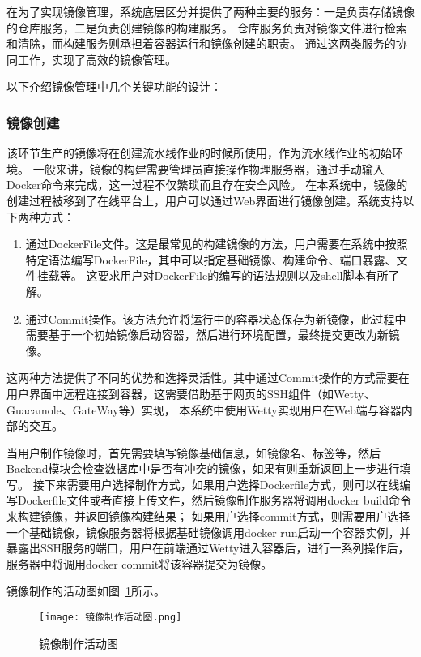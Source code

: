 在为了实现镜像管理，系统底层区分并提供了两种主要的服务：一是负责存储镜像的仓库服务，二是负责创建镜像的构建服务。
仓库服务负责对镜像文件进行检索和清除，而构建服务则承担着容器运行和镜像创建的职责。
通过这两类服务的协同工作，实现了高效的镜像管理。

以下介绍镜像管理中几个关键功能的设计：

\subsubsection{镜像创建}

该环节生产的镜像将在创建流水线作业的时候所使用，作为流水线作业的初始环境。
一般来讲，镜像的构建需要管理员直接操作物理服务器，通过手动输入Docker命令来完成，这一过程不仅繁琐而且存在安全风险。
在本系统中，镜像的创建过程被移到了在线平台上，用户可以通过Web界面进行镜像创建。系统支持以下两种方式：
\begin{enumerate}
  \item 通过DockerFile文件。这是最常见的构建镜像的方法，用户需要在系统中按照特定语法编写DockerFile，其中可以指定基础镜像、构建命令、端口暴露、文件挂载等。
  这要求用户对DockerFile的编写的语法规则以及shell脚本有所了解。
  \item 通过Commit操作。该方法允许将运行中的容器状态保存为新镜像，此过程中需要基于一个初始镜像启动容器，然后进行环境配置，最终提交更改为新镜像。
\end{enumerate}

这两种方法提供了不同的优势和选择灵活性。其中通过Commit操作的方式需要在用户界面中远程连接到容器，这需要借助基于网页的SSH组件（如Wetty、Guacamole、GateWay等）实现，
本系统中使用Wetty实现用户在Web端与容器内部的交互。

当用户制作镜像时，首先需要填写镜像基础信息，如镜像名、标签等，然后Backend模块会检查数据库中是否有冲突的镜像，如果有则重新返回上一步进行填写。
接下来需要用户选择制作方式，如果用户选择Dockerfile方式，则可以在线编写Dockerfile文件或者直接上传文件，然后镜像制作服务器将调用docker build命令来构建镜像，并返回镜像构建结果；
如果用户选择commit方式，则需要用户选择一个基础镜像，镜像服务器将根据基础镜像调用docker run启动一个容器实例，并暴露出SSH服务的端口，用户在前端通过Wetty进入容器后，进行一系列操作后，
服务器中将调用docker commit将该容器提交为镜像。

镜像制作的活动图如图~\ref{fig:镜像制作活动图}所示。

\begin{figure}[h]
  \centering
  \texttt{[image: 镜像制作活动图.png]}
  \caption{镜像制作活动图}
  \label{fig:镜像制作活动图}
\end{figure}

